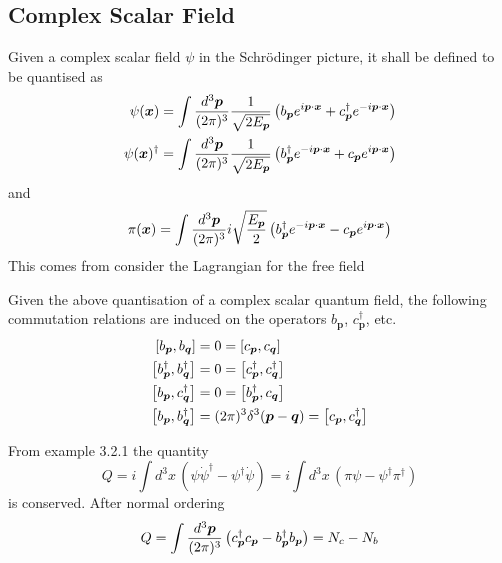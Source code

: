 \documentclass{article}
\begin{document}
\subsection{Complex Scalar Field}

\begin{definition}
Given a complex scalar field $\psi$ in the Schr\"odinger picture, it shall be defined to be quantised as
\begin{align*}
\psi(\bm{x}) &= \int\tmeas  \frac{1}{\sqrt{2E_{\bm{p}}}} \left( b_{\bm{p}} e^{i\bm{p}\cdot\bm{x}} + c_{\bm{p}}^\dagger e^{-i\bm{p}\cdot\bm{x}} \right) \\ 
\psi(\bm{x})^\dagger &= \int\tmeas  \frac{1}{\sqrt{2E_{\bm{p}}}} \left( b_{\bm{p}}^\dagger e^{-i\bm{p}\cdot\bm{x}} + c_{\bm{p}} e^{i\bm{p}\cdot\bm{x}} \right)
\end{align*}
and
\[
\pi(\bm{x})=\int\tmeas  i\sqrt{\frac{E_{\bm{p}}}{2}} \left( b_{\bm{p}}^\dagger e^{-i\bm{p}\cdot\bm{x}} - c_{\bm{p}} e^{i\bm{p}\cdot\bm{x}} \right)
\]
This comes from consider the Lagrangian for the free field
\end{definition}

\begin{theorem}
Given the above quantisation of a complex scalar quantum field, the following commutation relations are induced on the operators $b_{\bm{p}}$, $c_{\bm{p}}^\dagger$, etc. 
\begin{align*}
    \comm[b_{\bm{p}}]{b_{\bm{q}}} &= 0 = \comm[c_{\bm{p}}]{c_{\bm{q}}} \\
    \comm[b_{\bm{p}}^\dagger]{b_{\bm{q}}^\dagger} &= 0 = \comm[c_{\bm{p}}^\dagger]{c_{\bm{q}}^\dagger} \\
    \comm[b_{\bm{p}}]{c_{\bm{q}}^\dagger} &= 0 = \comm[b_{\bm{p}}^\dagger]{c_{\bm{q}}}\\
    \comm[b_{\bm{p}}]{b_{\bm{q}}^\dagger} &= (2\pi)^3 \delta^3(\bm{p}-\bm{q}) = \comm[c_{\bm{p}}]{c_{\bm{q}}^\dagger}
\end{align*}
\end{theorem}

\begin{theorem}
From example 3.2.1 the quantity
\[
Q=i \int d^3x \, \left( \psi\dot{\psi}^\dagger-\psi^\dagger\dot{\psi} \right) = i \int d^3x \, \left( \pi\psi - \psi^\dagger \pi^\dagger \right)
\]
is conserved. After normal ordering 
\[
Q=\int \tmeas \left( c_{\bm{p}}^\dagger c_{\bm{p}} - b_{\bm{p}}^\dagger b_{\bm{p}} \right) = N_c - N_b
\]
\end{theorem}
\end{document}
